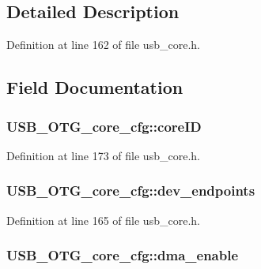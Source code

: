 \subsection{Detailed Description}


Definition at line 162 of file usb\-\_\-core.\-h.



\subsection{Field Documentation}
\hypertarget{struct_u_s_b___o_t_g__core__cfg_ab07e7b932e93878ff201ea917db818b9}{
\subsubsection[{core\-I\-D}]{ U\-S\-B\-\_\-\-O\-T\-G\-\_\-core\-\_\-cfg\-::core\-I\-D}}\label{struct_u_s_b___o_t_g__core__cfg_ab07e7b932e93878ff201ea917db818b9}


Definition at line 173 of file usb\-\_\-core.\-h.

\hypertarget{struct_u_s_b___o_t_g__core__cfg_a2e2aa3e74ba77db957b2cf7f6f02c62d}{
\subsubsection[{dev\-\_\-endpoints}]{ U\-S\-B\-\_\-\-O\-T\-G\-\_\-core\-\_\-cfg\-::dev\-\_\-endpoints}}\label{struct_u_s_b___o_t_g__core__cfg_a2e2aa3e74ba77db957b2cf7f6f02c62d}


Definition at line 165 of file usb\-\_\-core.\-h.

\hypertarget{struct_u_s_b___o_t_g__core__cfg_a568dd87637f670b9fd706f97fecea476}{
\subsubsection[{dma\-\_\-enable}]{ U\-S\-B\-\_\-\-O\-T\-G\-\_\-core\-\_\-cfg\-::dma\-\_\-enable}}\label{struct_u_s_b___o_t_g__core__cfg_a568dd87637f670b9fd706f97fecea476}


